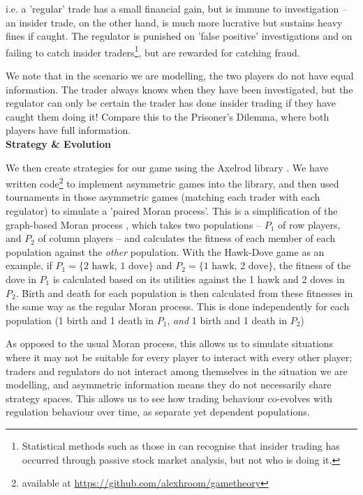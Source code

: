 \documentclass{article}
\begin{document}
i.e. a 'regular' trade has a small financial gain, but is immune to investigation -- an insider trade, on the other hand, is much more lucrative but sustains heavy fines if caught. The regulator is punished on 'false positive' investigations and on failing to catch insider traders\footnote{Statistical methods such as those in \textcite{bris2005insider} can recognise that insider trading has occurred through passive stock market analysis, but not who is doing it.}, but are rewarded for catching fraud. 

We note that in the scenario we are modelling, the two players do not have equal information. The trader always knows when they have been investigated, but the regulator can only be certain the trader has done insider trading if they have caught them doing it! Compare this to the Prisoner's Dilemma, where both players have full information.\\

\noindent\textbf{Strategy \& Evolution}

We then create strategies for our game using the Axelrod library \parencite{axelrodproject}. We have written code\footnote{available at \href{https://github.com/alexhroom/gametheory}{https://github.com/alexhroom/gametheory}} to implement asymmetric games into the library, and then used tournaments in those asymmetric games (matching each trader with each regulator) to simulate a 'paired Moran process'. This is a simplification of the graph-based Moran process \parencite{shakarian2013novel}, which takes two populations -- $P_1$ of row players, and $P_2$ of column players -- and calculates the fitness of each member of each population against the \emph{other} population. With the Hawk-Dove game as an example, if $P_1 = \{\text{2 hawk, 1 dove}\}$ and $P_2 = \{\text{1 hawk, 2 dove}\}$, the fitness of the dove in $P_1$ is calculated based on its utilities against the 1 hawk and 2 doves in $P_2$. Birth and death for each population is then calculated from these fitnesses in the same way as the regular Moran process. This is done independently for each population (1 birth and 1 death in $P_1$, \emph{and} 1 birth and 1 death in $P_2$)

As opposed to the usual Moran process, this allows us to simulate situations where it may not be suitable for every player to interact with every other player; traders and regulators do not interact among themselves in the situation we are modelling, and asymmetric information means they do not necessarily share strategy spaces. This allows us to see how trading behaviour co-evolves with regulation behaviour over time, as separate yet dependent populations.
\end{document}
